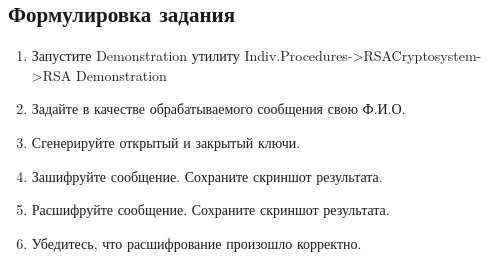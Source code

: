 \documentclass[a4paper, 14pt]{extarticle}
\begin{document}
\FloatBarrier{}
\subsection{Формулировка задания}
\begin{enumerate}
    \item Запустите Demonstration утилиту Indiv.Procedures->RSACryptosystem->RSA Demonstration
    \item  Задайте в качестве обрабатываемого сообщения свою Ф.И.О.
    \item  Сгенерируйте открытый и закрытый ключи.
    \item  Зашифруйте сообщение. Сохраните скриншот результата.
    \item  Расшифруйте сообщение. Сохраните скриншот результата.
    \item Убедитесь, что расшифрование произошло корректно.
\end{enumerate}
\end{document}
